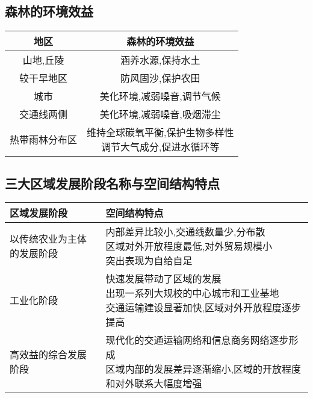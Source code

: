\documentclass[a4paper]{article}
\begin{document}
    \subsection{森林的环境效益}
        \begin{tabular}{|c|c|}
            \hline
            地区    &   森林的环境效益  \\
            \hline
            山地,丘陵  &   涵养水源,保持水土  \\
            \hline
            较干早地区  &   防风固沙,保护农田  \\
            \hline
            城市    &   美化环境,减弱噪音,调节气候    \\
            \hline
            交通线两侧  &   美化环境,减弱噪音,吸烟滞尘    \\
            \hline
            热带雨林分布区  &   \makecell[c]{维持全球碳氧平衡,保护生物多样性\\调节大气成分,促进水循环等} \\
            \hline
        \end{tabular}
    \subsection{三大区域发展阶段名称与空间结构特点}
        \begin{tabular}{|p{20mm}|l|}
            \hline
            区域发展阶段    &   空间结构特点    \\
            \hline
            以传统农业为主体的发展阶段  &   \makecell[l]{内部差异比较小,交通线数量少,分布散 \\ 区域对外开放程度最低,对外贸易规模小 \\ 突出表现为自给自足}  \\
            \hline
            工业化阶段  &  \makecell[l]{快速发展带动了区域的发展 \\ 出现一系列大规校的中心城市和工业基地 \\ 交通运输建设显著加快,区域对外开放程度逐步提高} \\
            \hline
            高效益的综合发展阶段    &   \makecell[l]{现代化的交通运输网络和信息商务网络逐步形成 \\ 区域内部的发展差异逐渐缩小,区域的开放程度和对外联系大幅度增强}    \\
            \hline
        \end{tabular}
\end{document}
